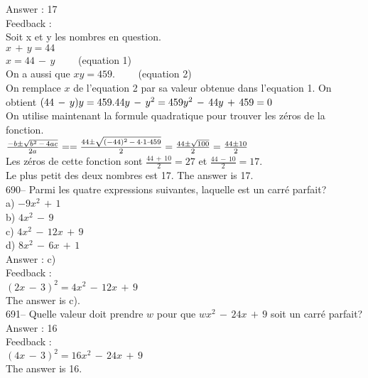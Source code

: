 \documentclass[letterpaper, 12pt]{article}
\begin{document}
Answer : 17\\

Feedback : \\
Soit x et y les nombres en question.\\
$x\,+\,y=44$\\
$x=44\,-\,y \qquad$ (equation 1)\\
On a aussi que $xy=459. \qquad$ (equation 2)\\
On remplace $x$ de l'equation 2 par sa valeur obtenue dans l'equation 1.
On obtient $(44\,-\,y)y=459.\\
44y\,-\,y^{2}=459\\
y^{2}\,-\,44y\,+\,459=0$\\

On utilise maintenant la formule quadratique pour trouver les z\'eros de la
fonction.\\[2mm]
$\frac{-b\pm \sqrt{b^{2}\,-\,4ac}}{2a}=\\[2mm]
=\frac{44\pm\sqrt{(-44)^{2}\,-\,4\cdot1\cdot459}}{2}\\[2mm]
=\frac{44\pm \sqrt{100}}{2}\\[2mm]
=\frac{44\pm 10}{2}$\\[2mm]
Les z\'eros de cette fonction sont $\frac{44\,+\,10}{2}=27$ et
$\frac{44\,-\,10}{2}=17$.\\[2mm]
Le plus petit des deux nombres est 17.  The answer is 17.\\


690-- Parmi les quatre expressions suivantes, laquelle est un carr\'e
parfait?\\
a) $-9x^{2}\,+\,1$\\
b) $4x^{2}\,-\,9$\\
c) $4x^{2}\,-\,12x\,+\,9$\\
d) $8x^{2}\,-\,6x\,+\,1$\\

Answer : c)\\

Feedback : \\
$(2x\,-\,3)^{2}=4x^{2}\,-\,12x\,+\,9$\\
The answer is c).\\

691-- Quelle valeur doit prendre $w$ pour que $wx^{2}\,-\,24x\,+\,9$ soit un
carr\'e parfait?\\

Answer : 16\\

Feedback : \\
$(4x\,-\,3)^{2}=16x^{2}\,-\,24x\,+\,9$\\
The answer is 16.\\
\end{document}
